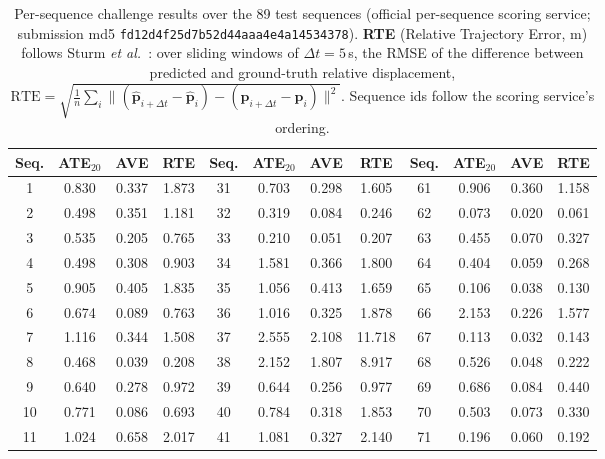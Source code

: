 \begin{table}[htbp]
    \centering\footnotesize
    \caption{Per-sequence challenge results over the 89 test sequences (official per-sequence scoring service; submission md5
    \texttt{fd12d4f25d7b52d44aaa4e4a14534378}). \textbf{RTE} (Relative Trajectory Error, m) follows Sturm \emph{et al.}~\cite{sturm2012rgbd}:
    over sliding windows of $\Delta t = 5$\,s, the RMSE of the difference between predicted and ground-truth relative displacement,
    $\mathrm{RTE} = \sqrt{\frac{1}{n}\sum_i \lVert (\hat{\mathbf{p}}_{i+\Delta t} - \hat{\mathbf{p}}_i) - (\mathbf{p}_{i+\Delta t} - \mathbf{p}_i) \rVert^2}$.
    Sequence ids follow the scoring service's ordering.}
    \label{tab:sequence_results}
    \setlength{\tabcolsep}{4pt}
    \begin{tabular}{cccc @{\hspace{2em}} cccc @{\hspace{2em}} cccc}
        \toprule
        Seq. & ATE$_{20}$ & AVE & RTE & Seq. & ATE$_{20}$ & AVE & RTE & Seq. & ATE$_{20}$ & AVE & RTE \\ \midrule
        1 & 0.830 & 0.337 & 1.873 & 31 & 0.703 & 0.298 & 1.605 & 61 & 0.906 & 0.360 & 1.158 \\
        2 & 0.498 & 0.351 & 1.181 & 32 & 0.319 & 0.084 & 0.246 & 62 & 0.073 & 0.020 & 0.061 \\
        3 & 0.535 & 0.205 & 0.765 & 33 & 0.210 & 0.051 & 0.207 & 63 & 0.455 & 0.070 & 0.327 \\
        4 & 0.498 & 0.308 & 0.903 & 34 & 1.581 & 0.366 & 1.800 & 64 & 0.404 & 0.059 & 0.268 \\
        5 & 0.905 & 0.405 & 1.835 & 35 & 1.056 & 0.413 & 1.659 & 65 & 0.106 & 0.038 & 0.130 \\
        6 & 0.674 & 0.089 & 0.763 & 36 & 1.016 & 0.325 & 1.878 & 66 & 2.153 & 0.226 & 1.577 \\
        7 & 1.116 & 0.344 & 1.508 & 37 & 2.555 & 2.108 & 11.718 & 67 & 0.113 & 0.032 & 0.143 \\
        8 & 0.468 & 0.039 & 0.208 & 38 & 2.152 & 1.807 & 8.917 & 68 & 0.526 & 0.048 & 0.222 \\
        9 & 0.640 & 0.278 & 0.972 & 39 & 0.644 & 0.256 & 0.977 & 69 & 0.686 & 0.084 & 0.440 \\
        10 & 0.771 & 0.086 & 0.693 & 40 & 0.784 & 0.318 & 1.853 & 70 & 0.503 & 0.073 & 0.330 \\
        11 & 1.024 & 0.658 & 2.017 & 41 & 1.081 & 0.327 & 2.140 & 71 & 0.196 & 0.060 & 0.192 \\

\end{tabular}
\end{table}
